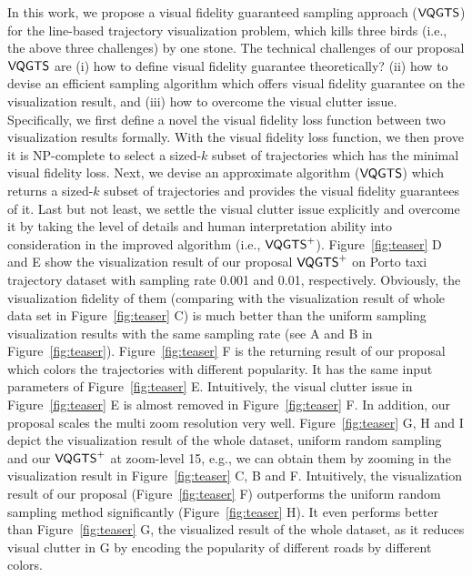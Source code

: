 In this work, we propose a visual fidelity guaranteed sampling approach ($\mathsf{VQGTS}{}$) for the line-based trajectory visualization problem,
which kills three birds (i.e., the above three challenges) by one stone.
The technical challenges of our proposal $\mathsf{VQGTS}{}$ are 
(i) how to define visual fidelity guarantee theoretically?
(ii) how to devise an efficient sampling algorithm which offers visual fidelity guarantee on the visualization result,
and (iii) how to overcome the visual clutter issue.
Specifically, we first define a novel the visual fidelity loss function between two visualization results formally.
With the visual fidelity loss function, we then prove it is NP-complete to select a sized-$k$ subset of trajectories which has the minimal visual fidelity loss.
Next, we devise an approximate algorithm ($\mathsf{VQGTS}$) which returns a sized-$k$ subset of trajectories and provides the visual fidelity guarantees of it.
Last but not least, we settle the visual clutter issue explicitly and overcome it by taking the level of details and human interpretation ability into consideration in the improved algorithm (i.e., $\mathsf{VQGTS}^{+}$).
Figure~\ref{fig:teaser} D and E show the visualization result of our proposal $\mathsf{VQGTS}^{+}{}$ on Porto taxi trajectory dataset with sampling rate 0.001 and 0.01, respectively.
Obviously, the visualization fidelity of them (comparing with the visualization result of whole data set in Figure~\ref{fig:teaser} C) is much better than 
the uniform sampling visualization results with the same sampling rate  (see A and B in Figure~\ref{fig:teaser}).
Figure~\ref{fig:teaser} F is the returning result of our proposal which colors the trajectories with different popularity.
It has the same input parameters of Figure~\ref{fig:teaser} E. 
Intuitively, the visual clutter issue in Figure~\ref{fig:teaser} E is almost removed in Figure~\ref{fig:teaser} F.
In addition, our proposal scales the multi zoom resolution very well.
Figure~\ref{fig:teaser} G, H and I depict the visualization result of the whole dataset, uniform random sampling and our $\mathsf{VQGTS}^{+}$ at zoom-level 15,
e.g., we can obtain them by zooming in the visualization result in Figure~\ref{fig:teaser} C, B and F.
Intuitively, the visualization result of our proposal (Figure~\ref{fig:teaser} F) outperforms the uniform random sampling method significantly (Figure~\ref{fig:teaser} H).
It even performs better than Figure~\ref{fig:teaser} G, the visualized result of the whole dataset, as it reduces visual clutter in G by encoding the popularity of different roads by different colors.

